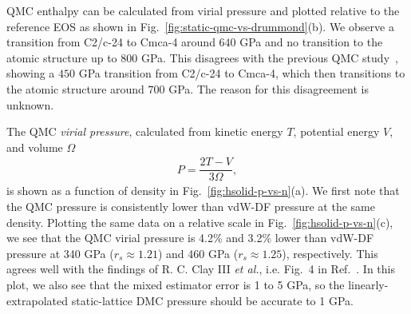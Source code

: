 QMC enthalpy can be calculated from virial pressure and plotted relative to the reference EOS as shown in Fig.~\ref{fig:static-qmc-vs-drummond}(b). We observe a transition from C2/c-24 to Cmca-4 around $640$ GPa and no transition to the atomic structure up to $800$ GPa.
This disagrees with the previous QMC study~\cite{McMinis2015}, showing a $450$ GPa transition from C2/c-24 to Cmca-4, which then transitions to the atomic structure around $700$ GPa.
The reason for this disagreement is unknown.

The QMC \emph{virial pressure}, calculated from kinetic energy $T$, potential energy $V$, and volume $\Omega$
\begin{align}
P = \dfrac{2T-V}{3\Omega},
\end{align}
is shown as a function of density in Fig.~\ref{fig:hsolid-p-vs-n}(a).
We first note that the QMC pressure is consistently lower than vdW-DF pressure at the same density.
Plotting the same data on a relative scale in Fig.~\ref{fig:hsolid-p-vs-n}(c),
we see that the QMC virial pressure is 4.2\% and 3.2\% lower than vdW-DF pressure at 340 GPa ($r_s\approx 1.21$) and 460 GPa ($r_s\approx 1.25$), respectively. This agrees well with the findings of R. C. Clay III \textit{et al.}, i.e. Fig.~4 in Ref.~\cite{Clay2016}.
In this plot, we also see that the mixed estimator error is 1 to 5 GPa, so the linearly-extrapolated static-lattice DMC pressure should be accurate to 1 GPa.

